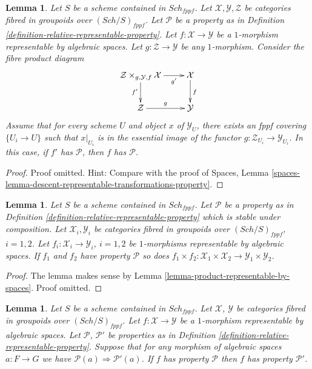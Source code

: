 \documentclass{stacks-project}
\theoremstyle{plain}
\newtheorem{lemma}[subsection]{Lemma}
\theoremstyle{definition}
\theoremstyle{remark}
\numberwithin{equation}{subsection}
\def\Sch{\mathit{Sch}}
\begin{document}
\begin{lemma}
\label{lemma-descent-representable-transformations-property}
Let $S$ be a scheme contained in $\Sch_{fppf}$.
Let $\mathcal{X}, \mathcal{Y}, \mathcal{Z}$
be categories fibred in groupoids over $(\Sch/S)_{fppf}$.
Let $\mathcal{P}$ be a property as in
Definition \ref{definition-relative-representable-property}.
Let $f : \mathcal{X} \to \mathcal{Y}$ be a $1$-morphism
representable by algebraic spaces.
Let $g : \mathcal{Z} \to \mathcal{Y}$ be any $1$-morphism.
Consider the fibre product diagram
$$
\xymatrix{
\mathcal{Z} \times_{g, \mathcal{Y}, f} \mathcal{X} \ar[r]_-{g'} \ar[d]_{f'} &
\mathcal{X} \ar[d]^f \\
\mathcal{Z} \ar[r]^g & \mathcal{Y}
}
$$
Assume that for every scheme $U$ and object $x$ of $\mathcal{Y}_U$,
there exists an fppf covering $\{U_i \to U\}$ such that $x|_{U_i}$
is in the essential image of the functor
$g : \mathcal{Z}_{U_i} \to \mathcal{Y}_{U_i}$.
In this case, if $f'$ has $\mathcal{P}$, then $f$ has $\mathcal{P}$.
\end{lemma}

\begin{proof}
Proof omitted. Hint: Compare with the proof of
Spaces,
Lemma \ref{spaces-lemma-descent-representable-transformations-property}.
\end{proof}

\begin{lemma}
\label{lemma-product-representable-transformations-property}
Let $S$ be a scheme contained in $\Sch_{fppf}$.
Let $\mathcal{P}$ be a property as in
Definition \ref{definition-relative-representable-property}
which is stable under composition.
Let $\mathcal{X}_i, \mathcal{Y}_i$ be categories fibred in groupoids over
$(\Sch/S)_{fppf}$, $i = 1, 2$.
Let $f_i : \mathcal{X}_i \to \mathcal{Y}_i$, $i = 1, 2$
be $1$-morphisms representable by algebraic spaces.
If $f_1$ and $f_2$ have property $\mathcal{P}$ so does
$
f_1 \times f_2 :
\mathcal{X}_1 \times \mathcal{X}_2
\to
\mathcal{Y}_1 \times \mathcal{Y}_2
$.
\end{lemma}

\begin{proof}
The lemma makes sense by
Lemma \ref{lemma-product-representable-by-spaces}.
Proof omitted.
\end{proof}

\begin{lemma}
\label{lemma-representable-transformations-property-implication}
Let $S$ be a scheme contained in $\Sch_{fppf}$.
Let $\mathcal{X}$, $\mathcal{Y}$ be categories fibred in groupoids
over $(\Sch/S)_{fppf}$.
Let $f : \mathcal{X} \to \mathcal{Y}$ be a $1$-morphism representable
by algebraic spaces.
Let $\mathcal{P}$, $\mathcal{P}'$ be properties as in
Definition \ref{definition-relative-representable-property}.
Suppose that for any morphism of algebraic spaces $a : F \to G$
we have $\mathcal{P}(a) \Rightarrow \mathcal{P}'(a)$.
If $f$ has property $\mathcal{P}$ then
$f$ has property $\mathcal{P}'$.
\end{lemma}
\end{document}
